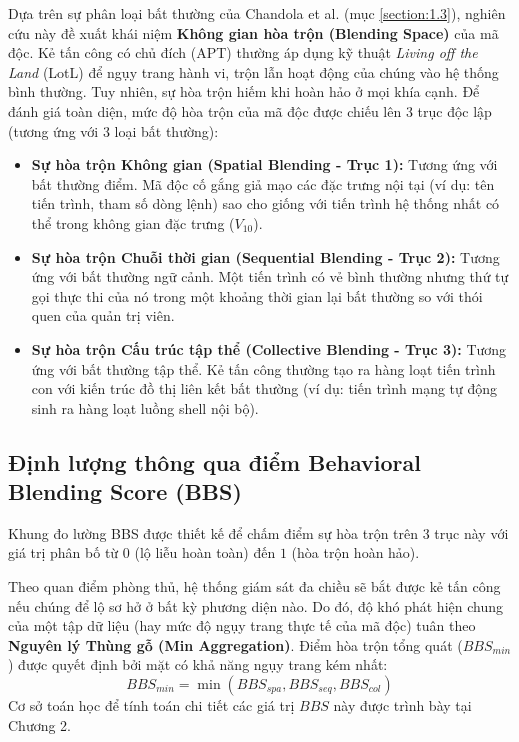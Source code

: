 \documentclass[../main.tex]{subfiles}
\begin{document}
Dựa trên sự phân loại bất thường của Chandola et al. (mục \ref{section:1.3}), nghiên cứu này đề xuất khái niệm \textbf{Không gian hòa trộn (Blending Space)} của mã độc. Kẻ tấn công có chủ đích (APT) thường áp dụng kỹ thuật \textit{Living off the Land} (LotL) để ngụy trang hành vi, trộn lẫn hoạt động của chúng vào hệ thống bình thường. Tuy nhiên, sự hòa trộn hiếm khi hoàn hảo ở mọi khía cạnh. Để đánh giá toàn diện, mức độ hòa trộn của mã độc được chiếu lên 3 trục độc lập (tương ứng với 3 loại bất thường):

\begin{itemize}
    \item \textbf{Sự hòa trộn Không gian (Spatial Blending - Trục 1):} Tương ứng với bất thường điểm. Mã độc cố gắng giả mạo các đặc trưng nội tại (ví dụ: tên tiến trình, tham số dòng lệnh) sao cho giống với tiến trình hệ thống nhất có thể trong không gian đặc trưng ($V_{10}$).
    \item \textbf{Sự hòa trộn Chuỗi thời gian (Sequential Blending - Trục 2):} Tương ứng với bất thường ngữ cảnh. Một tiến trình có vẻ bình thường nhưng thứ tự gọi thực thi của nó trong một khoảng thời gian lại bất thường so với thói quen của quản trị viên.
    \item \textbf{Sự hòa trộn Cấu trúc tập thể (Collective Blending - Trục 3):} Tương ứng với bất thường tập thể. Kẻ tấn công thường tạo ra hàng loạt tiến trình con với kiến trúc đồ thị liên kết bất thường (ví dụ: tiến trình mạng tự động sinh ra hàng loạt luồng shell nội bộ).
\end{itemize}

\subsection{Định lượng thông qua điểm Behavioral Blending Score (BBS)}
Khung đo lường BBS được thiết kế để chấm điểm sự hòa trộn trên 3 trục này với giá trị phân bố từ $0$ (lộ liễu hoàn toàn) đến $1$ (hòa trộn hoàn hảo). 

Theo quan điểm phòng thủ, hệ thống giám sát đa chiều sẽ bắt được kẻ tấn công nếu chúng để lộ sơ hở ở bất kỳ phương diện nào. Do đó, độ khó phát hiện chung của một tập dữ liệu (hay mức độ ngụy trang thực tế của mã độc) tuân theo \textbf{Nguyên lý Thùng gỗ (Min Aggregation)}. Điểm hòa trộn tổng quát ($BBS_{min}$) được quyết định bởi mặt có khả năng ngụy trang kém nhất:
\begin{equation}
    BBS_{min} = \min(BBS_{spa}, BBS_{seq}, BBS_{col})
\end{equation}
Cơ sở toán học để tính toán chi tiết các giá trị $BBS$ này được trình bày tại Chương 2.
\end{document}
